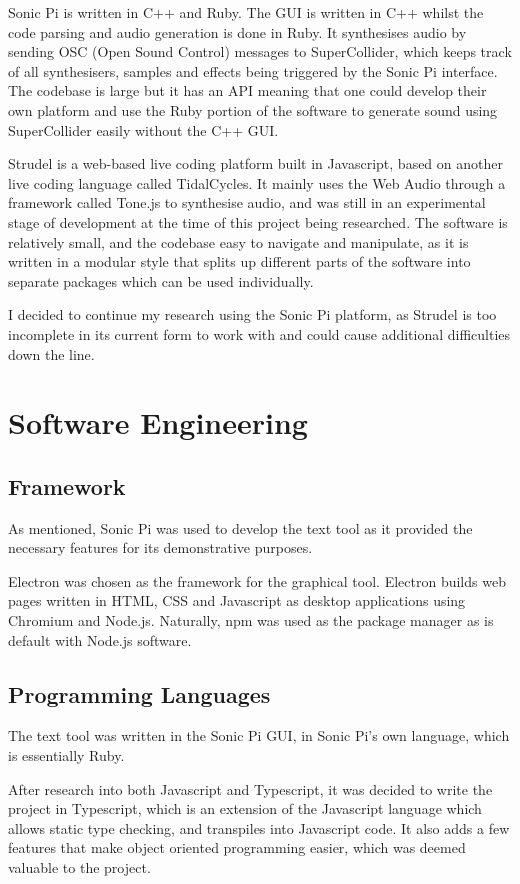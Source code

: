 \documentclass[12pt,a4paper,twoside,openright]{report}
\begin{document}
Sonic Pi is written in C++ and Ruby. The GUI is written in C++ whilst the code parsing and audio generation is done in Ruby. It synthesises audio by sending OSC (Open Sound Control) messages to SuperCollider, which keeps track of all synthesisers, samples and effects being triggered by the Sonic Pi interface. The codebase is large but it has an API meaning that one could develop their own platform and use the Ruby portion of the software to generate sound using SuperCollider easily without the C++ GUI.

Strudel is a web-based live coding platform built in Javascript, based on another live coding language called TidalCycles. It mainly uses the Web Audio through a framework called Tone.js to synthesise audio, and was still in an experimental stage of development at the time of this project being researched. The software is relatively small, and the codebase easy to navigate and manipulate, as it is written in a modular style that splits up different parts of the software into separate packages which can be used individually.

I decided to continue my research using the Sonic Pi platform, as Strudel is too incomplete in its current form to work with and could cause additional difficulties down the line.

\section{Software Engineering}
\subsection{Framework}
As mentioned, Sonic Pi was used to develop the text tool as it provided the necessary features for its demonstrative purposes.

Electron was chosen as the framework for the graphical tool. Electron builds web pages written in HTML, CSS and Javascript as desktop applications using Chromium and Node.js. Naturally, npm was used as the package manager as is default with Node.js software. 

\subsection{Programming Languages}
The text tool was written in the Sonic Pi GUI, in Sonic Pi's own language, which is essentially Ruby.

After research into both Javascript and Typescript, it was decided to write the project in Typescript, which is an extension of the Javascript language which allows static type checking, and transpiles into Javascript code. It also adds a few features that make object oriented programming easier, which was deemed valuable to the project.
\end{document}
